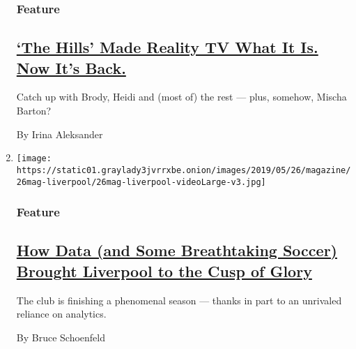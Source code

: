 \begin{enumerate}
  \hypertarget{feature-2}{%
  \subsubsection{Feature}\label{feature-2}}

  \hypertarget{the-hills-made-reality-tv-what-it-is-now-its-back}{%
  \subsection{\texorpdfstring{\href{/2019/05/23/magazine/the-hills-reality-tv.html}{`The
  Hills' Made Reality TV What It Is. Now It's
  Back.}}{`The Hills' Made Reality TV What It Is. Now It's Back.}}\label{the-hills-made-reality-tv-what-it-is-now-its-back}}

  Catch up with Brody, Heidi and (most of) the rest --- plus, somehow,
  Mischa Barton?

  By Irina Aleksander
\item
  \texttt{[image: https://static01.graylady3jvrrxbe.onion/images/2019/05/26/magazine/26mag-liverpool/26mag-liverpool-videoLarge-v3.jpg]}

  \hypertarget{feature-3}{%
  \subsubsection{Feature}\label{feature-3}}

  \hypertarget{how-data-and-some-breathtaking-soccer-brought-liverpool-to-the-cusp-of-glory}{%
  \subsection{\texorpdfstring{\href{/2019/05/22/magazine/soccer-data-liverpool.html}{How
  Data (and Some Breathtaking Soccer) Brought Liverpool to the Cusp of
  Glory}}{How Data (and Some Breathtaking Soccer) Brought Liverpool to the Cusp of Glory}}\label{how-data-and-some-breathtaking-soccer-brought-liverpool-to-the-cusp-of-glory}}

  The club is finishing a phenomenal season --- thanks in part to an
  unrivaled reliance on analytics.

  By Bruce Schoenfeld
\end{enumerate}

